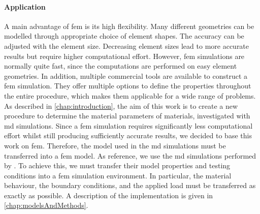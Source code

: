 \paragraph{Application}
A main advantage of \acrshort{fem} is its high flexibility. Many different geometries can be modelled through appropriate choice of element shapes. The accuracy can be adjusted with the element size. Decreasing element sizes lead to more accurate results but require higher computational effort. However, \acrshort{fem} simulations are normally quite fast, since the computations are performed on easy element geometries. In addition, multiple commercial tools are available to construct a \acrshort{fem} simulation. They offer multiple options to define the properties throughout the entire procedure, which makes them applicable for a wide range of problems. \\
As described in \autoref{chap:introduction}, the aim of this work is to create a new procedure to determine the material parameters of materials, investigated with \acrshort{md} simulations. Since a \acrshort{fem} simulation requires significantly less computational effort whilst still producing sufficiently accurate results, we decided to base this work on \acrshort{fem}. Therefore, the model used in the \acrshort{md} simulations must be transferred into a \acrshort{fem} model. As reference, we use the \acrshort{md} simulations performed by \citet{ries_deciphering_nodate}. To achieve this, we must transfer their model properties and testing conditions into a \acrshort{fem} simulation environment. In particular, the material behaviour, the boundary conditions, and the applied load must be transferred as exactly as possible. A description of the implementation is given in \autoref{chap:modelsAndMethods}.







